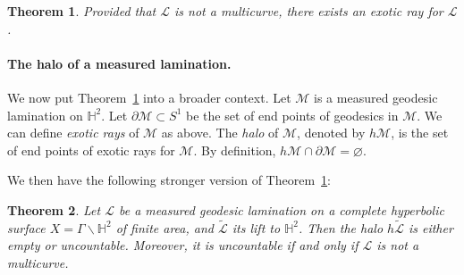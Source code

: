 \documentclass[11pt]{article} %
\theoremstyle{plain}
\newtheorem{thm}{Theorem}[section]
\theoremstyle{definition}
\numberwithin{equation}{section}
\begin{document}
\begin{thm} \label{main1}
Provided that $\mathcal{L}$ is not a multicurve, there exists an exotic ray for $\mathcal{L}$.
\end{thm}
\paragraph{The halo of a measured lamination.}
 We now put Theorem~\ref{main1} into a broader context. Let $\mathcal{M}$ is a measured geodesic lamination on $\mathbb{H}^2$. Let $\partial\mathcal{M}\subset S^1$ be the set of end points of geodesics in $\mathcal{M}$. We can define \emph{exotic rays} of $\mathcal{M}$ as above. The \emph{halo} of $\mathcal{M}$, denoted by $h\mathcal{M}$, is the set of end points of exotic rays for $\mathcal{M}$. By definition, $h\mathcal{M}\cap \partial\mathcal{M}=\varnothing$.

We then have the following stronger version of Theorem~\ref{main1}:
\begin{thm}\label{mainprime}
Let $\mathcal{L}$ be a measured geodesic lamination on a complete hyperbolic surface $X=\Gamma\backslash\mathbb{H}^2$ of finite area, and $\tilde{\mathcal{L}}$ its lift to $\mathbb{H}^2$. Then the halo $h\widetilde{\mathcal{L}}$ is either empty or uncountable. Moreover, it is uncountable if and only if $\mathcal{L}$ is not a multicurve.
\end{thm}
\end{document}
